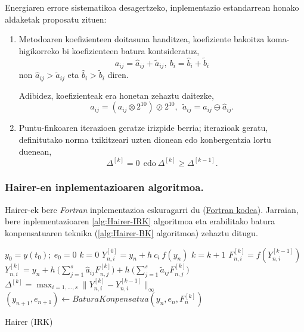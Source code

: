 Energiaren errore sistematikoa desagertzeko, inplementazio estandarrean honako aldaketak proposatu zituen:
\begin{enumerate}
\item Metodoaren koefizienteen doitasuna handitzea, koefiziente bakoitza koma-higikorreko bi koefizienteen batura kontsideratuz,
\begin{equation}
\label{eq:hkoef}
a_{ij}= \hat a_{ij}+\tilde a_{ij}, \ b_i= \hat b_i+\tilde b_i
\end{equation} 
non $\hat a_{ij}>\tilde a_{ij}$ eta  $\hat b_i>\tilde b_i$ diren. 

Adibidez, koefizienteak era honetan zehaztu daitezke,
\begin{equation*}
\hat a_{ij}=(a_{ij} \otimes 2^{10}) \oslash 2^{10},\ \ \tilde a_{ij}= a_{ij}\ominus \hat a_{ij}.
\end{equation*}

\item Puntu-finkoaren iterazioen geratze irizpide berria; iterazioak geratu, definitutako norma txikitzeari uzten dionean edo konbergentzia lortu duenean,
\begin{equation}
\label{eq:hstop}
\Delta^{[k]} = 0 \ \ \text{edo} \  \Delta^{[k]} \geqslant \Delta^{[k-1]}.
\end{equation}
  	 	
\end{enumerate}

\subsubsection*{Hairer-en inplementazioaren algoritmoa.}

Hairer-ek bere \emph{Fortran} inplementazioa eskuragarri du (\href{http://www.unige.ch/~hairer/preprints.html}{Fortran kodea}). Jarraian, bere inplementazioaren \ref{alg:Hairer-IRK} algoritmoa eta erabilitako batura konpensatuaren teknika (\ref{alg:Hairer-BK} algoritmoa) zehaztu ditugu.
 
\begin{algorithm}[h!]
 \BlankLine
  $y_0=y(t_0); \ e_0=0$\;
  {
   \BlankLine
   $k=0$\;
   $Y_{n,i}^{[0]}=y_n+h \ c_i \ f(y_n) $\; 
   \BlankLine
   {
    \BlankLine 
    $k=k+1$\;
    $F_{n,i}^{[k]}=f(Y_{n,i}^{[k-1]}) $\;
    $Y_{n,i}^{[k]}=y_n+ h \ \big(\sum\limits_{j=1}^{s} \hat a_{ij} F_{n,j}^{[k]} \big) 
                          + h \ \big(\sum\limits_{j=1}^{s} \tilde a_{ij} F_{n,j}^{[k]} \big)$\; 
    $\Delta ^{[k]} = \max_{i=1,\dots,s}\|Y_{n,i}^{[k]}-Y_{n,i}^{[k-1]}\|_{\infty}$\;
   }
   \BlankLine
   $(y_{n+1},e_{n+1})\leftarrow BaturaKonpensatua(y_n,e_n,F_n^{[k]})$\;      
   \BlankLine
 }
 \caption{Hairer (IRK)}
 \label{alg:Hairer-IRK}
\end{algorithm}


